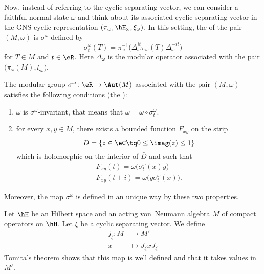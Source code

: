 Now, instead of referring to the cyclic separating vector, we can consider a faithful normal state $\omega$ and think about its associated cyclic separating vector in the GNS cyclic representation $(\pi_{\omega},\hH_{\omega},\xi_{\omega})$. In this setting, the  of the pair $(M,\omega)$ is $\sigma^{\omega}$ defined by
\begin{equation}
	\sigma_t^{\omega}(T)=\pi_{\omega}^{-1}\big( \Delta_{\omega}^{it}\pi_{\omega}(T)\Delta_{\omega}^{-it} \big)
\end{equation}
for $T\in M$ and $t\in\eR$. Here $\Delta_{\omega}$ is the modular operator associated with the pair $\big( \pi_{\omega}(M),\xi_{\omega} \big)$.

\begin{theorem}
	The modular group $\sigma^{\omega}\colon \eR\to \Aut(M)$ associated with the pair $(M,\omega)$ satisfies the following conditions (the ):
	\begin{enumerate}
		\item
		      $\omega$ is $\sigma^{\omega}$-invariant, that means that $\omega=\omega\circ\sigma_t^{\omega}$.
		\item
		      for every $x,y\in M$, there exists a bounded function $F_{xy}$ on the strip
		      \begin{equation}
			      \bar D=\{ z\in\eC\tq 0\leq\imag(z)\leq 1 \}
		      \end{equation}
		      which is holomorphic on the interior of $\bar D$ and such that
		      \begin{subequations}
			      \begin{align}
				      F_{xy}(t)=\omega\big( \sigma^{\omega}_t(x)y \big) \\
				      F_{xy}(t+i)=\omega\big(y \sigma^{\omega}_t(x) \big).
			      \end{align}
		      \end{subequations}

	\end{enumerate}
	Moreover, the map $\sigma^{\omega}$ is defined in an unique way by these two properties.
\end{theorem}

Let $\hH$ be an Hilbert space and an acting von~Neumann algebra $M$ of compact operators on $\hH$. Let $\xi$ be a cyclic separating vector. We define
\begin{equation}
	\begin{aligned}
		j_{\xi}\colon M & \to M'                  \\
		x               & \mapsto J_{\xi}xJ_{\xi}
	\end{aligned}
\end{equation}
Tomita's theorem shows that this map is well defined and that it takes values in $M'$.

